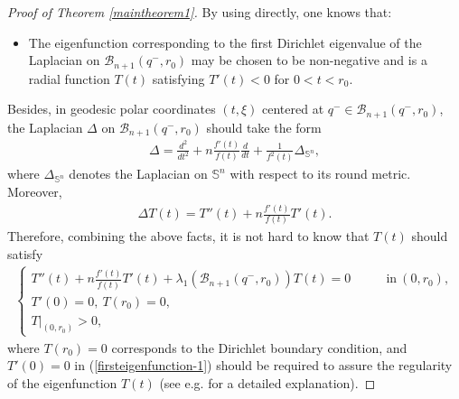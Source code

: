 \documentclass[12pt]{article}
\begin{document}
\begin{proof} [Proof of Theorem \ref{maintheorem1}]
By using \cite[Lemma 3.2]{FMI} directly, one knows that:
\begin{itemize}
\item The eigenfunction corresponding to the first Dirichlet eigenvalue
of the Laplacian on $\mathscr{B}_{n+1}(q^{-},r_0)$ may be chosen to
be non-negative and is a radial function $T(t)$ satisfying $T'(t)<0$
for $0<t<r_0$.
\end{itemize}
Besides, in geodesic polar coordinates $(t,\xi)$ centered at
$q^{-}\in \mathscr{B}_{n+1}(q^{-},r_0)$, the Laplacian $\Delta$ on
$\mathscr{B}_{n+1}(q^{-},r_0)$ should take the form
\begin{eqnarray*}
\Delta=\frac{d^{2}}{dt^{2}}+n\frac{f'(t)}{f(t)}\frac{d}{dt}
+\frac{1}{f^{2}(t)}\Delta_{\mathbb{S}^{n}},
\end{eqnarray*}
where $\Delta_{\mathbb{S}^{n}}$ denotes the Laplacian on
$\mathbb{S}^n$ with respect to its round metric. Moreover,
 \begin{eqnarray*}
\Delta T(t)=T''(t) + n \frac{f'(t)}{f(t)} T'(t).
 \end{eqnarray*}
Therefore, combining the above facts, it is not hard to know that
$T(t)$ should satisfy
\begin{eqnarray} \label{firsteigenfunction-1}
\left\{
\begin{array}{lll}
T''(t) + n \frac{f'(t)}{f(t)} T'(t) + \lambda_{1}\left(\mathscr{B}_{n+1}(q^{-},r_0)\right)T(t) = 0 \qquad &\mathrm{in}~\left(0,r_0\right),  \\[1mm]
T'(0)=0,~T\left(r_0\right)=0, \\[0.5mm]
 T|_{(0,r_0)}>0,
\end{array} \right.
\end{eqnarray}
where $T\left(r_0\right)=0$ corresponds to the Dirichlet boundary
condition, and $T'(0)=0$ in (\ref{firsteigenfunction-1}) should be
required to assure the regularity of the eigenfunction $T(t)$ (see
e.g. \cite[Section 4, Chapter II]{IC} for a detailed explanation).


\end{proof}
\end{document}
